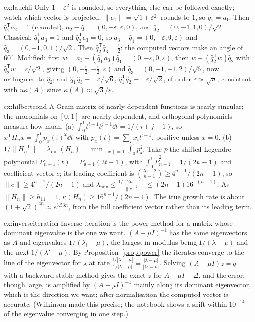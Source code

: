 \begin{solution}{ex:lauchli}
\idea Only $1+\varepsilon^2$ is rounded, so everything else can be followed exactly; watch which vector is projected.
\writeup $\|a_1\|=\sqrt{1+\varepsilon^2}$ rounds to $1$, so $\hat q_1=a_1$. Then $\hat q_1^{\mathsf T}a_2=1$ (rounded), $a_2-\hat q_1=(0,-\varepsilon,\varepsilon,0)$, and
$\hat q_2=(0,-1,1,0)/\sqrt2$. Classical: $\hat q_1^{\mathsf T}a_3=1$ and $\hat q_2^{\mathsf T}a_3=0$, so $a_3-\hat q_1=(0,-\varepsilon,0,\varepsilon)$ and
$\hat q_3=(0,-1,0,1)/\sqrt2$. Then $\hat q_2^{\mathsf T}\hat q_3=\frac12$: the computed vectors make an angle of $60^\circ$. Modified: first
$w=a_3-(\hat q_1^{\mathsf T}a_3)\hat q_1=(0,-\varepsilon,0,\varepsilon)$, then $w-(\hat q_2^{\mathsf T}w)\hat q_2$ with $\hat q_2^{\mathsf T}w=\varepsilon/\sqrt2$, giving
$(0,-\frac\varepsilon2,-\frac\varepsilon2,\varepsilon)$ and $\hat q_3=(0,-1,-1,2)/\sqrt6$, now orthogonal to $\hat q_2$; and
$\hat q_1^{\mathsf T}\hat q_3=-\varepsilon/\sqrt6$, $\hat q_1^{\mathsf T}\hat q_2=-\varepsilon/\sqrt2$, of order $\varepsilon\approx\sqrt u$, consistent with $u\kappa(A)$
since $\kappa(A)\approx\sqrt3/\varepsilon$.
\end{solution}

\begin{solution}{ex:hilbertcond}
\idea A Gram matrix of nearly dependent functions is nearly singular; the monomials on $[0,1]$ are nearly dependent, and orthogonal polynomials measure how much.
\writeup (a) $\int_0^1t^{i-1}t^{j-1}\dd t=1/(i+j-1)$, so $x^{\mathsf T}H_nx=\int_0^1p_x(t)^2\dd t$ with $p_x(t)=\sum_ix_it^{i-1}$, positive unless $x=0$.
(b) $1/\|H_n^{-1}\|=\lambda_{\min}(H_n)=\min_{\|x\|=1}\int_0^1p_x^2$. Take $p$ the shifted Legendre polynomial $\tilde P_{n-1}(t)=P_{n-1}(2t-1)$, with
$\int_0^1\tilde P_{n-1}^2=1/(2n-1)$ and coefficient vector $c$; its leading coefficient is $\binom{2n-2}{n-1}\ge4^{n-1}/(2n-1)$, so $\|c\|\ge4^{n-1}/(2n-1)$ and
$\lambda_{\min}\le\frac{1/(2n-1)}{\|c\|^2}\le(2n-1)16^{-(n-1)}$. As $\|H_n\|\ge h_{11}=1$, $\kappa(H_n)\ge16^{n-1}/(2n-1)$. The true growth rate is about
$(1+\sqrt2)^{4n}\approx e^{3.53n}$, from the full coefficient vector rather than its leading term.
\end{solution}

\begin{solution}{ex:inverseiteration}
\idea Inverse iteration is the power method for a matrix whose dominant eigenvalue is the one we want.
\writeup $(A-\mu I)^{-1}$ has the same eigenvectors as $A$ and eigenvalues $1/(\lambda_i-\mu)$, the largest in modulus being $1/(\lambda-\mu)$ and the next
$1/(\lambda'-\mu)$. By Proposition~\ref{prop:power} the iterates converge to the line of the eigenvector for $\lambda$ at rate
$\frac{1/|\lambda'-\mu|}{1/|\lambda-\mu|}=\frac{|\lambda-\mu|}{|\lambda'-\mu|}$. Solving $(A-\mu I)z=q$ with a backward stable method gives the exact $z$ for
$A-\mu I+\Delta$, and the error, though large, is amplified by $(A-\mu I)^{-1}$ mainly along its dominant eigenvector, which is the direction we want; after
normalisation the computed vector is accurate. (Wilkinson made this precise; the notebook shows a shift within $10^{-14}$ of the eigenvalue converging in one step.)
\end{solution}

